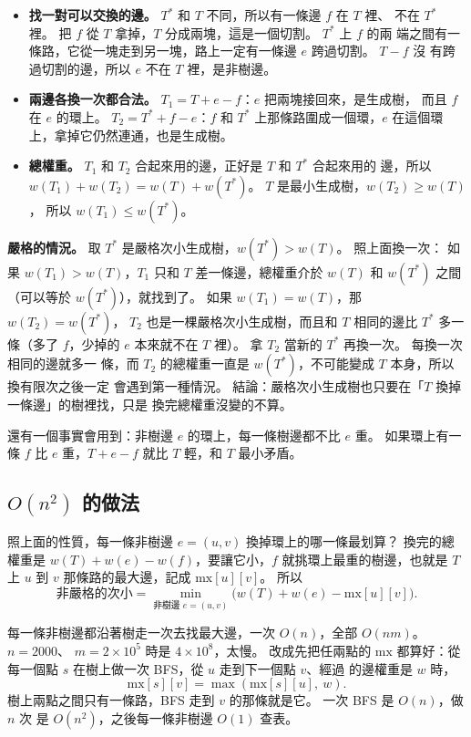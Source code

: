\begin{itemize}
\item \textbf{找一對可以交換的邊。} $T^*$ 和 $T$ 不同，所以有一條邊 $f$ 在 $T$ 裡、
不在 $T^*$ 裡。 把 $f$ 從 $T$ 拿掉，$T$ 分成兩塊，這是一個切割。 $T^*$ 上 $f$ 的兩
端之間有一條路，它從一塊走到另一塊，路上一定有一條邊 $e$ 跨過切割。 $T - f$ 沒
有跨過切割的邊，所以 $e$ 不在 $T$ 裡，是非樹邊。
\item \textbf{兩邊各換一次都合法。} $T_1 = T + e - f$：$e$ 把兩塊接回來，是生成樹，
而且 $f$ 在 $e$ 的環上。 $T_2 = T^* + f - e$：$f$ 和 $T^*$ 上那條路圍成一個環，$e$
在這個環上，拿掉它仍然連通，也是生成樹。
\item \textbf{總權重。} $T_1$ 和 $T_2$ 合起來用的邊，正好是 $T$ 和 $T^*$ 合起來用的
邊，所以 $w(T_1) + w(T_2) = w(T) + w(T^*)$。 $T$ 是最小生成樹，$w(T_2) \ge w(T)$，
所以 $w(T_1) \le w(T^*)$。
\end{itemize}

\textbf{嚴格的情況。} 取 $T^*$ 是嚴格次小生成樹，$w(T^*) > w(T)$。 照上面換一次：
如果 $w(T_1) > w(T)$，$T_1$ 只和 $T$ 差一條邊，總權重介於 $w(T)$ 和 $w(T^*)$ 之間
（可以等於 $w(T^*)$），就找到了。 如果 $w(T_1) = w(T)$，那 $w(T_2) = w(T^*)$，
$T_2$ 也是一棵嚴格次小生成樹，而且和 $T$ 相同的邊比 $T^*$ 多一條（多了 $f$，少掉的
$e$ 本來就不在 $T$ 裡）。 拿 $T_2$ 當新的 $T^*$ 再換一次。 每換一次相同的邊就多一
條，而 $T_2$ 的總權重一直是 $w(T^*)$，不可能變成 $T$ 本身，所以換有限次之後一定
會遇到第一種情況。 結論：嚴格次小生成樹也只要在「$T$ 換掉一條邊」的樹裡找，只是
換完總權重沒變的不算。

還有一個事實會用到：非樹邊 $e$ 的環上，每一條樹邊都不比 $e$ 重。 如果環上有一條
$f$ 比 $e$ 重，$T + e - f$ 就比 $T$ 輕，和 $T$ 最小矛盾。

\subsection{$O(n^2)$ 的做法}

照上面的性質，每一條非樹邊 $e = (u, v)$ 換掉環上的哪一條最划算？ 換完的總權重是
$w(T) + w(e) - w(f)$，要讓它小，$f$ 就挑環上最重的樹邊，也就是 $T$ 上 $u$ 到 $v$
那條路的最大邊，記成 $\mathrm{mx}[u][v]$。 所以
\[
\text{非嚴格的次小} = \min_{\text{非樹邊 } e = (u, v)}
\bigl(w(T) + w(e) - \mathrm{mx}[u][v]\bigr).
\]

每一條非樹邊都沿著樹走一次去找最大邊，一次 $O(n)$，全部 $O(nm)$。 $n = 2000$、
$m = 2 \times 10^5$ 時是 $4 \times 10^8$，太慢。 改成先把任兩點的
$\mathrm{mx}$ 都算好：從每一個點 $s$ 在樹上做一次 BFS，從 $u$ 走到下一個點 $v$、經過
的邊權重是 $w$ 時，
\[
\mathrm{mx}[s][v] = \max(\mathrm{mx}[s][u],\ w).
\]
樹上兩點之間只有一條路，BFS 走到 $v$ 的那條就是它。 一次 BFS 是 $O(n)$，做 $n$ 次
是 $O(n^2)$，之後每一條非樹邊 $O(1)$ 查表。

